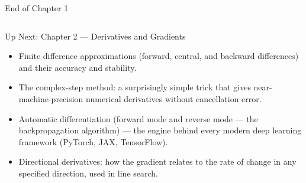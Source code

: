 \documentclass[aspectratio=169,10pt]{beamer}
\begin{document}
\begin{frame}{End of Chapter 1}
\begin{columns}[c]
\begin{block}{Up Next: Chapter 2 --- Derivatives and Gradients}
\begin{itemize}
          \item Finite difference approximations (forward, central, and
            backward differences) and their accuracy and stability.
          \item The complex-step method: a surprisingly simple trick that
            gives near-machine-precision numerical derivatives without
            cancellation error.
          \item Automatic differentiation (forward mode and reverse mode ---
            the backpropagation algorithm) --- the engine behind every modern
            deep learning framework (PyTorch, JAX, TensorFlow).
          \item Directional derivatives: how the gradient relates to the
            rate of change in any specified direction, used in line search.
        \end{itemize}
      \end{block}
  \end{columns}
\end{frame}
\end{document}
